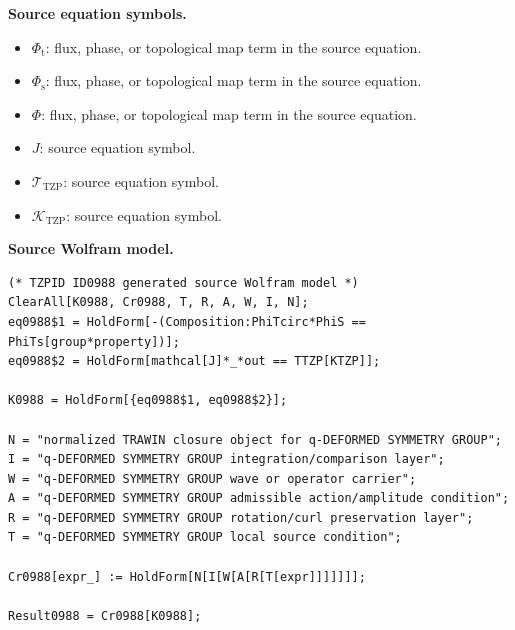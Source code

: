 \begin{minipage}[t]{0.49\linewidth}
\begingroup
\small
\raggedright
\textbf{Source equation symbols.}\par
\begin{itemize}[leftmargin=1.35em,itemsep=1pt,topsep=1pt,parsep=0pt]
    \item $\Phi_{\mathrm{t}}$: flux, phase, or topological map term in the source equation.
    \item $\Phi_{\mathrm{s}}$: flux, phase, or topological map term in the source equation.
    \item $\Phi$: flux, phase, or topological map term in the source equation.
    \item $J$: source equation symbol.
    \item $\mathcal{T}_{\mathrm{TZP}}$: source equation symbol.
    \item $\mathcal{K}_{\mathrm{TZP}}$: source equation symbol.
\end{itemize}
\endgroup
\end{minipage}\hfill
\begin{minipage}[t]{0.47\linewidth}
\begingroup
\scriptsize
\raggedright
\textbf{Source Wolfram model.}\par
\begin{Verbatim}[fontsize=\tiny,breaklines=true,breakanywhere=true]
(* TZPID ID0988 generated source Wolfram model *)
ClearAll[K0988, Cr0988, T, R, A, W, I, N];
eq0988$1 = HoldForm[-(Composition:PhiTcirc*PhiS == PhiTs[group*property])];
eq0988$2 = HoldForm[mathcal[J]*_*out == TTZP[KTZP]];

K0988 = HoldForm[{eq0988$1, eq0988$2}];

N = "normalized TRAWIN closure object for q-DEFORMED SYMMETRY GROUP";
I = "q-DEFORMED SYMMETRY GROUP integration/comparison layer";
W = "q-DEFORMED SYMMETRY GROUP wave or operator carrier";
A = "q-DEFORMED SYMMETRY GROUP admissible action/amplitude condition";
R = "q-DEFORMED SYMMETRY GROUP rotation/curl preservation layer";
T = "q-DEFORMED SYMMETRY GROUP local source condition";

Cr0988[expr_] := HoldForm[N[I[W[A[R[T[expr]]]]]]];

Result0988 = Cr0988[K0988];
\end{Verbatim}
\endgroup
\end{minipage}

